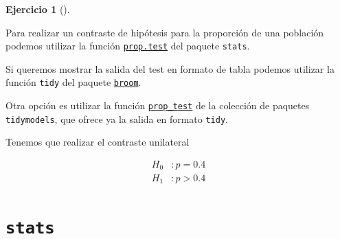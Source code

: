 \documentclass[
  a4paper,
]{scrreport}
\newenvironment{Shaded}{\begin{snugshade}}{\end{snugshade}}
\newcommand{\AttributeTok}[1]{\textcolor[rgb]{0.40,0.45,0.13}{#1}}
\newcommand{\FloatTok}[1]{\textcolor[rgb]{0.68,0.00,0.00}{#1}}
\newcommand{\FunctionTok}[1]{\textcolor[rgb]{0.28,0.35,0.67}{#1}}
\newcommand{\NormalTok}[1]{\textcolor[rgb]{0.00,0.23,0.31}{#1}}
\newcommand{\OtherTok}[1]{\textcolor[rgb]{0.00,0.23,0.31}{#1}}
\newcommand{\SpecialCharTok}[1]{\textcolor[rgb]{0.37,0.37,0.37}{#1}}
\newcommand{\StringTok}[1]{\textcolor[rgb]{0.13,0.47,0.30}{#1}}
\theoremstyle{definition}
\newtheorem{exercise}{Ejercicio}[chapter]
\theoremstyle{remark}
\begin{document}
\begin{exercise}[]
\begin{enumerate}
\begin{tcolorbox}
  Para realizar un contraste de hipótesis para la proporción de una
  población podemos utilizar la función
  \href{https://www.rdocumentation.org/packages/stats/versions/3.6.2/topics/prop.test}{\texttt{prop.test}}
  del paquete \texttt{stats}.

  Si queremos mostrar la salida del test en formato de tabla podemos
  utilizar la función \texttt{tidy} del paquete
  \href{https://broom.tidymodels.org/index.html}{\texttt{broom}}.

  Otra opción es utilizar la función
  \href{https://infer.tidymodels.org/reference/prop_test.html}{\texttt{prop\_test}}
  de la colección de paquetes \texttt{tidymodels}, que ofrece ya la
  salida en formato \texttt{tidy}.

  \end{tcolorbox}

  \begin{tcolorbox}[enhanced jigsaw, coltitle=black, left=2mm, colback=white, leftrule=.75mm, toptitle=1mm, breakable, bottomrule=.15mm, titlerule=0mm, bottomtitle=1mm, title=\textcolor{quarto-callout-tip-color}{\faLightbulb}\hspace{0.5em}{Solución}, arc=.35mm, toprule=.15mm, rightrule=.15mm, colframe=quarto-callout-tip-color-frame, opacityback=0, colbacktitle=quarto-callout-tip-color!10!white, opacitybacktitle=0.6]

  Tenemos que realizar el contraste unilateral

  \begin{align*}
  H_0 &: p = 0.4\\
  H_1 &: p > 0.4 
  \end{align*}

  \section{\texorpdfstring{\texttt{stats}}{stats}}

\begin{Shaded}
\end{Shaded}


\end{tcolorbox}
\end{enumerate}
\end{exercise}
\end{document}
